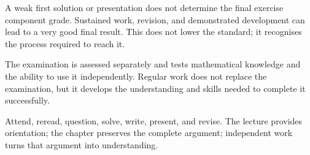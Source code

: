 A weak first solution or presentation does not determine the final exercise
component grade. Sustained work, revision, and demonstrated development can lead
to a very good final result. This does not lower the standard; it recognises the
process required to reach it.

The examination is assessed separately and tests mathematical knowledge and the
ability to use it independently. Regular work does not replace the examination,
but it develops the understanding and skills needed to complete it successfully.

Attend, reread, question, solve, write, present, and revise. The lecture provides
orientation; the chapter preserves the complete argument; independent work turns
that argument into understanding.

